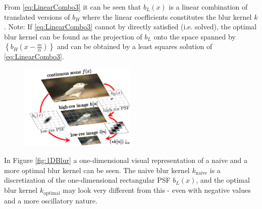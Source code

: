 \documentclass[11pt]{article}
\begin{document}
From \ref{eq:LinearCombo3} it can be seen that $b_L(x)$ is a linear combination of translated versions of $b_H$ where the linear coefficients constitutes the blur kernel $k$. Note: If \ref{eq:LinearCombo3} cannot by directly satisfied (i.e. solved), the optimal blur kernel can be found as the projection of $b_L$ onto the space spanned by $\left\{b_H (x - \frac{m}{\alpha})\right\}$ and can be obtained by a least squares solution of \ref{eq:LinearCombo3}.\\
\begin{figure}[h]
	\centering
	\includegraphics[width=0.5\textwidth]{RelationBtwImages.png}
	\caption{}
	\label{fig:RelationBtwImages}
\end{figure}
In Figure \ref{fig:1DBlur} a one-dimensional visual representation of a naive and a more optimal blur kernel can be seen. The naive blur kernel $k_{\text{naive}}$ is a discretization of the one-dimensional rectangular PSF $b_L(x)$, and the optimal blur kernel $k_{\text{optimal}}$ may look very different from this - even with negative values and a more oscillatory nature.
\end{document}
